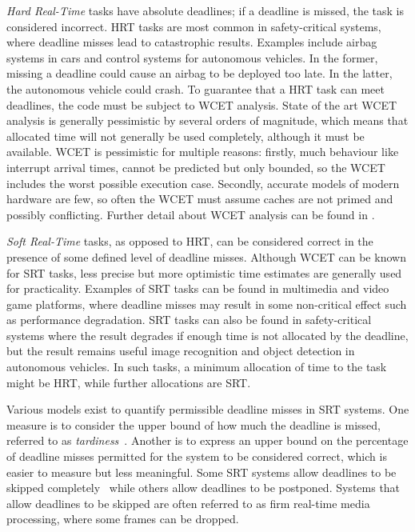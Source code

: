\emph{Hard Real-Time} tasks have absolute deadlines; if a deadline is missed,
the task is considered incorrect. \gls{HRT} tasks are most common in safety-critical systems, where
deadline misses lead to catastrophic results.  Examples include airbag systems
in cars and control systems for autonomous vehicles.  In the former, missing a deadline could cause
an airbag to be deployed too late.  In the latter, the autonomous vehicle could crash.  To guarantee
that a \gls{HRT} task can meet deadlines, the code must be subject to {\gls{WCET}} analysis. State
of the art {\gls{WCET}} analysis is generally pessimistic by several orders of magnitude, which
means that allocated time will not generally be used completely, although it must be available.
WCET is pessimistic for multiple reasons: firstly, much behaviour like interrupt arrival times, 
cannot be predicted but only
bounded, so the WCET includes the worst possible execution case. Secondly, accurate models of modern
hardware are few, so often the WCET must assume caches are not primed and possibly conflicting. 
Further detail about {\gls{WCET}} analysis can be found in \citet{Lv_GZDYZ_09}.

\emph{Soft Real-Time} tasks, as opposed to \gls{HRT}, can be
considered correct in the presence of some defined level of deadline misses. Although {\gls{WCET}}
can be known for {\gls{SRT}} tasks, less precise but more optimistic time estimates are generally
used for practicality.  Examples of \gls{SRT} tasks can be found in multimedia and video game platforms,
where deadline misses may result in some non-critical effect such as performance degradation.
\gls{SRT} tasks can also be found in safety-critical systems where the result degrades if enough time is not
allocated by the deadline, but the result remains useful \eg image recognition and object detection
in autonomous vehicles. In such tasks, a minimum allocation of time to the task might be \gls{HRT},
while further allocations are \gls{SRT}.

Various models exist to quantify permissible deadline misses in \gls{SRT} systems.  One measure is
to consider the upper bound of how much the deadline is missed, referred to as
\emph{tardiness}~\citep{Devi:phd}.  Another is to express an upper bound on the percentage of
deadline misses permitted for the system to be considered correct, which is easier to measure but
less meaningful. Some \gls{SRT} systems allow deadlines to be skipped
completely~\citep{Koren_Shasha_95} while others allow deadlines to be postponed. Systems that allow
deadlines to be skipped are often referred to as firm real-time \eg media processing, where some
frames can be dropped. 

